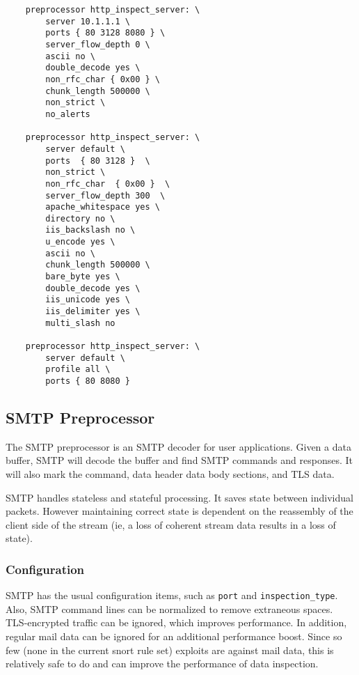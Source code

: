 \documentclass[english]{report}
\begin{document}
\begin{verbatim}
    preprocessor http_inspect_server: \
        server 10.1.1.1 \
        ports { 80 3128 8080 } \
        server_flow_depth 0 \
        ascii no \
        double_decode yes \
        non_rfc_char { 0x00 } \
        chunk_length 500000 \
        non_strict \
        no_alerts

    preprocessor http_inspect_server: \
        server default \ 
        ports  { 80 3128 }  \
        non_strict \
        non_rfc_char  { 0x00 }  \
        server_flow_depth 300  \
        apache_whitespace yes \
        directory no \
        iis_backslash no \
        u_encode yes \
        ascii no \
        chunk_length 500000 \
        bare_byte yes \
        double_decode yes \
        iis_unicode yes \ 
        iis_delimiter yes \
        multi_slash no

    preprocessor http_inspect_server: \
        server default \
        profile all \
        ports { 80 8080 }
\end{verbatim}

\subsection{SMTP Preprocessor}
\label{SMTP}

The SMTP preprocessor is an SMTP decoder for user applications.  Given a data
buffer, SMTP will decode the buffer and find SMTP commands and responses.  It
will also mark the command, data header data body sections, and TLS data.

SMTP handles stateless and stateful processing.  It saves state between
individual packets.  However maintaining correct state is dependent on the
reassembly of the client side of the stream (ie, a loss of coherent stream data
results in a loss of state).

\subsubsection{Configuration}

SMTP has the usual configuration items, such as \texttt{port} and
\texttt{inspection\_type}.  Also, SMTP command lines can be normalized to
remove extraneous spaces.  TLS-encrypted traffic can be ignored, which improves
performance.  In addition, regular mail data can be ignored for an additional
performance boost.  Since so few (none in the current snort rule set) exploits
are against mail data, this is relatively safe to do and can improve the
performance of data inspection.
\end{document}
